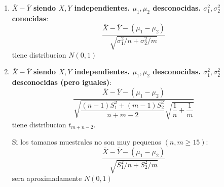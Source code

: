 \documentclass[10pt]{extarticle}
\newcommand{\<}{\langle}
\renewcommand{\>}{\rangle}
\theoremstyle{definition}
\begin{document}
\begin{enumerate}
  \item \textbf{$\overline{X}- \overline{Y}$ siendo $X, Y$ independientes. $\mu_1, \mu_2$ desconocidas. $\sigma_1^2, \sigma_2^2$ conocidas}:
        \begin{equation*}
          \dfrac{\overline{X}-\overline{Y} - (\mu_1-\mu_2)}{\sqrt{\sigma_1^2/n + \sigma_2^2/m}}
        \end{equation*}
        tiene distribucion $N(0,1)$
  \item \textbf{$\overline{X}- \overline{Y}$ siendo $X, Y$ independientes. $\mu_1, \mu_2$ desconocidas. $\sigma_1^2, \sigma_2^2$ desconocidas (pero iguales)}:
        \begin{equation*}
          \dfrac{\overline{X}-\overline{Y} - (\mu_1-\mu_2)}{\sqrt{\dfrac{(n-1)S_1^2 + (m-1)S_2^2}{n+m-2}} \sqrt{\dfrac{1}{n} + \dfrac{1}{m}}}
        \end{equation*}
        tiene distribucion $t_{m+n-2}$.

        Si los tamanos muestrales no son muy pequenos $(n, m \geq 15)$:
        \begin{equation*}
          \dfrac{\overline{X}-\overline{Y} - (\mu_1-\mu_2)}{\sqrt{S_1^2/n + S_2^2/m}}
        \end{equation*}
        sera aproximadamente $N(0,1)$


\end{enumerate}
\end{document}
